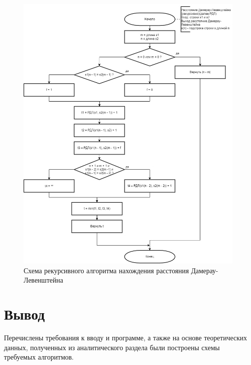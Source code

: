 \begin{figure}[H]
	\centering
	\includegraphics[width=0.7\linewidth]{inc/img/recdamlev}
	\caption{Схема рекурсивного алгоритма нахождения расстояния Дамерау-Левенштейна}
	\label{fig:recdamlev}
\end{figure}

\section*{Вывод}

Перечислены требования к вводу и программе, а также на основе теоретических данных, полученных из аналитического раздела были построены схемы требуемых алгоритмов.





